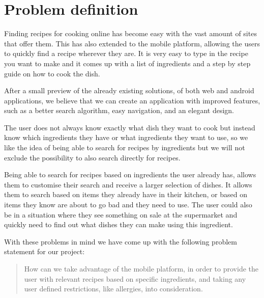 \section{Problem definition}\label{sec:probdef}

Finding recipes for cooking online has become easy with the vast amount of sites that offer them. This has also extended to the mobile platform, allowing the users to quickly find a recipe wherever they are. It is very easy to type in the recipe you want to make and it comes up with a list of ingredients and a step by step guide on how to cook the dish.

After a small preview of the already existing solutions, of both web and android applications, we believe that we can create an application with improved features, such as a better search algorithm, easy navigation, and an elegant design. 

The user does not always know exactly what dish they want to cook but instead know which ingredients they have or what ingredients they want to use, so we like the idea of being able to search for recipes by ingredients but we will not exclude the possibility to also search directly for recipes. 

Being able to search for recipes based on ingredients the user already has, allows them to customise their search and receive a larger selection of dishes. It allows them to search based on items they already have in their kitchen, or based on items they know are about to go bad and they need to use. The user could also be in a situation where they see something on sale at the supermarket and quickly need to find out what dishes they can make using this ingredient.

With these problems in mind we have come up with the following problem statement for our project:

\begin{quote}
How can we take advantage of the mobile platform, in order to provide the user with relevant recipes based on specific ingredients, and taking any user defined restrictions, like allergies, into consideration.
\end{quote}